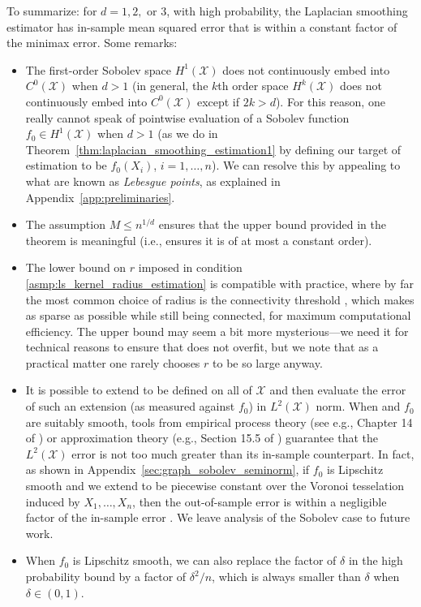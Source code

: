 \documentclass[twoside]{article}
\newcommand{\red}[1]{\textcolor{red}{#1}}
\newcommand{\green}[1]{\textcolor{green}{#1}}
\newcommand{\sbcomment}[1]{{\bf{{\red{{SB --- #1}}}}}}
\newcommand{\agcomment}[1]{{\bf{{\green{{AG --- #1}}}}}}
\newcommand{\1}{\mathbf{1}}
\newcommand{\Xset}{\mathcal{X}}
\newcommand{\Leb}{L}
\newcommand{\wh}[1]{\widehat{#1}}
\theoremstyle{definition}
\theoremstyle{remark}
\begin{document}
To summarize: for $d = 1,2,$ or $3$, with high probability, the Laplacian smoothing estimator \smash{$\wh{f}$} has in-sample mean squared error that is within a constant factor of the minimax error. Some remarks:
\begin{itemize}
	\item The first-order Sobolev space $H^1(\Xset)$ does not continuously embed into $C^0(\Xset)$ when $d>1$ (in general, the $k$th order space $H^k(\Xset)$ does not continuously embed into $C^0(\Xset)$ except if $2k>d$). For this reason, one really cannot speak of pointwise evaluation of a Sobolev function $f_0 \in H^1(\Xset)$ when $d>1$ (as we do in Theorem~\ref{thm:laplacian_smoothing_estimation1} by defining our target of estimation to be $f_0(X_i)$, $i=1,\ldots,n$). We can resolve this by appealing to what are known as \emph{Lebesgue points}, as explained in Appendix~\ref{app:preliminaries}.
	\item The assumption $M \leq n^{1/d}$ ensures that the upper bound provided in the theorem is meaningful (i.e., ensures it is of at most a constant order).
	\item The lower bound on $r$ imposed in condition \ref{asmp:ls_kernel_radius_estimation} is compatible with practice, where by far the most common choice of radius is the connectivity threshold , which makes  as sparse as possible while still being connected, for maximum computational efficiency. The upper bound may seem a bit more mysterious---we need it for technical reasons to ensure that \smash{$\wh{f}$} does not overfit, but we note that as a practical matter one rarely chooses $r$ to be so large anyway.
	\item It is possible to extend \smash{$\wh{f}$} to be defined on all of $\Xset$ and then evaluate the error of such an extension (as measured against $f_0$) in $\Leb^2(\Xset)$ norm. When \smash{$\wh{f}$} and $f_0$ are suitably smooth, tools from empirical process theory (see e.g., Chapter 14 of \citet{wainwright2019}) or approximation theory (e.g., Section 15.5 of \citet{johnstone2011}) guarantee that the $\Leb^2(\Xset)$ error is not too much greater than its in-sample counterpart. In fact, as shown in Appendix~\ref{sec:graph_sobolev_seminorm}, if $f_0$ is Lipschitz smooth and we extend \smash{$\wh{f}$} to be piecewise constant over the Voronoi tesselation induced by $X_1,\ldots,X_n$, then the out-of-sample error \smash{$\|\wh{f}-f_0\|_{\Leb^2(\Xset)}$} is within a negligible factor of the in-sample error \smash{$\|\wh{f}-f_0\|_n$}. We leave analysis of the Sobolev case to future work.
	\item When $f_0$ is Lipschitz smooth, we can also replace the factor of $\delta$ in the high probability bound by a factor of $\delta^2/n$, which is always smaller than $\delta$ when $\delta \in (0,1)$.\\
\end{itemize} 
\end{document}
